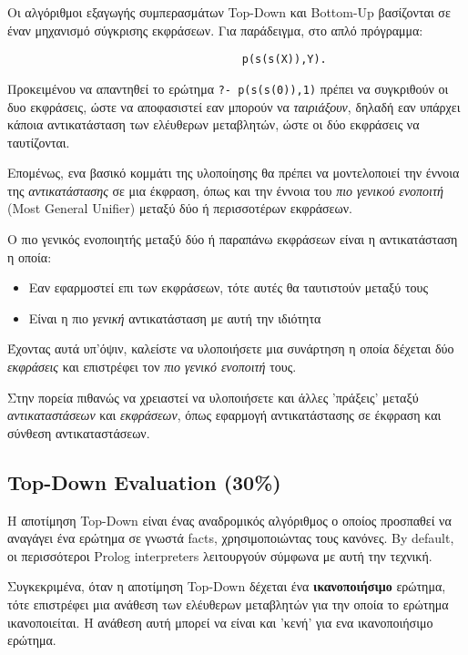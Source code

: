 \documentclass[10pt]{article}
\begin{document}
Οι αλγόριθμοι εξαγωγής συμπερασμάτων Top-Down και Bottom-Up βασίζονται σε έναν μηχανισμό σύγκρισης εκφράσεων. Για παράδειγμα, στο απλό πρόγραμμα:

\begin{verbatim}
                                    p(s(s(X)),Y).
\end{verbatim}

Προκειμένου να απαντηθεί το ερώτημα \verb|?- p(s(s(0)),1)| πρέπει να συγκριθούν οι δυο εκφράσεις, ώστε να αποφασιστεί εαν μπορούν να \textit{ταιριάξουν}, δηλαδή εαν υπάρχει κάποια αντικατάσταση των ελέυθερων μεταβλητών, ώστε οι δύο εκφράσεις να ταυτίζονται. \

Επομένως, ενα βασικό κομμάτι της υλοποίησης θα πρέπει να μοντελοποιεί την έννοια της \textit{αντικατάστασης} σε μια έκφραση, όπως και την έννοια του \textit{πιο γενικού ενοποιτή} (Most General Unifier) μεταξύ δύο ή περισσοτέρων εκφράσεων.

Ο πιο γενικός ενοποιητής μεταξύ δύο ή παραπάνω εκφράσεων είναι η αντικατάσταση η οποία:
\begin{itemize}
    \item Εαν εφαρμοστεί επι των εκφράσεων, τότε αυτές θα ταυτιστούν μεταξύ τους 
    \item Είναι η πιο \textit{γενική} αντικατάσταση με αυτή την ιδιότητα
\end{itemize}

Έχοντας αυτά υπ'όψιν, καλείστε να υλοποιήσετε μια συνάρτηση η οποία δέχεται δύο \textit{εκφράσεις} και επιστρέφει τον \textit{πιο γενικό ενοποιτή} τους.\

Στην πορεία πιθανώς να χρειαστεί να υλοποιήσετε και άλλες 'πράξεις' μεταξύ \textit{αντικαταστάσεων} και \textit{εκφράσεων}, όπως εφαρμογή αντικατάστασης σε έκφραση και σύνθεση αντικαταστάσεων.


\subsection*{Top-Down Evaluation (30\%)}

Η αποτίμηση Top-Down είναι ένας αναδρομικός αλγόριθμος ο οποίος προσπαθεί να αναγάγει ένα ερώτημα σε γνωστά facts, χρησιμοποιώντας τους κανόνες. By default, οι περισσότεροι Prolog interpreters λειτουργούν σύμφωνα με αυτή την τεχνική.\

Συγκεκριμένα, όταν η αποτίμηση Top-Down δέχεται ένα \textbf{ικανοποιήσιμο} ερώτημα, τότε επιστρέφει μια ανάθεση των ελέυθερων μεταβλητών για την οποία το ερώτημα ικανοποιείται. H ανάθεση αυτή μπορεί να είναι και 'κενή' για ενα ικανοποιήσιμο ερώτημα.\
\end{document}

